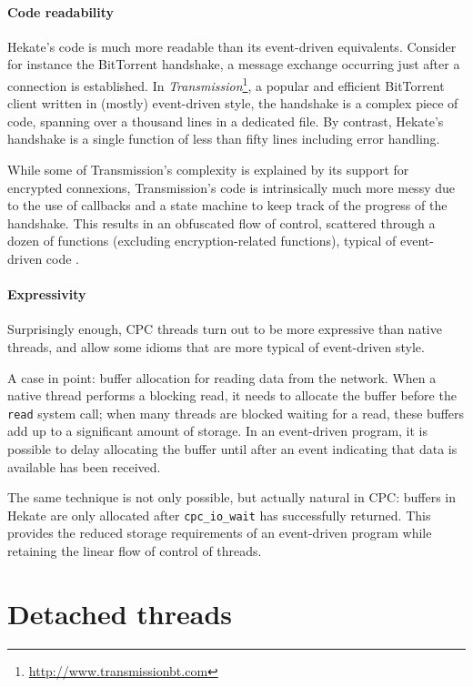 \documentclass{easychair}
\begin{document}
\paragraph{Code readability}

Hekate's code is much more readable than its event-driven equivalents.
Consider for instance the BitTorrent handshake, a message exchange
occurring just after a connection is established.  In
\emph{Transmission}\footnote{\url{http://www.transmissionbt.com}},
a popular and efficient BitTorrent client written in (mostly)
event-driven style, the handshake is a complex piece of code, spanning
over a thousand lines in a dedicated file.  By contrast, Hekate's
handshake is a single function of less than fifty lines including error
handling.

While some of Transmission's complexity is explained by its support for
encrypted connexions, Transmission's code is intrinsically much more
messy due to the use of callbacks and a state machine to keep track of
the progress of the handshake.  This results in an obfuscated flow of
control, scattered through a dozen of functions (excluding
encryption-related functions), typical of event-driven code \cite{adya}.

\paragraph{Expressivity}

Surprisingly enough, CPC threads turn out to be more expressive than native
threads, and allow some idioms that are more typical of event-driven style.

A case in point: buffer allocation for reading data from the network.
When a native thread performs a blocking read, it needs to allocate the
buffer before the \texttt{read} system call; when many threads are
blocked waiting for a read, these buffers add up to a significant amount
of storage.  In an event-driven program, it is possible to delay
allocating the buffer until after an event indicating that data is
available has been received.

The same technique is not only possible, but actually natural in CPC:
buffers in Hekate are only allocated after \texttt{cpc\_io\_wait} has
successfully returned.  This provides the reduced storage requirements
of an event-driven program while retaining the linear flow of control of
threads.

\section{Detached threads}
\label{sec:detached-threads}
\end{document}
